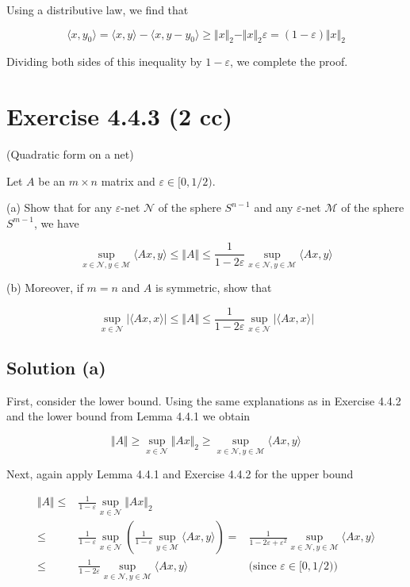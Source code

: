 \documentclass{article}
\begin{document}
Using a distributive law, we find that

$$\langle x, y_0 \rangle = \langle x, y \rangle - \langle x, y - y_0 \rangle \geq \Vert x \Vert_2 - \Vert x \Vert_2 \varepsilon = (1 - \varepsilon) \Vert x \Vert_2$$

Dividing both sides of this inequality by $1 - \varepsilon$, we complete the proof.

\section{Exercise 4.4.3 (2 cc)}
(Quadratic form on a net)

Let $A$ be an $m \times n$ matrix and $\varepsilon \in [0, 1/2)$.

(a) Show that for any $\varepsilon$-net $\mathcal N$ of the sphere $S^{n-1}$ and any $\varepsilon$-net $\mathcal M$ of the sphere $S^{m-1}$, we have

$$\sup_{x \in \mathcal N, y \in \mathcal M} \langle Ax, y \rangle \leq \Vert A \Vert \leq \frac{1}{1 - 2\varepsilon}\sup_{x \in \mathcal N, y \in \mathcal M} \langle Ax, y \rangle$$

(b) Moreover, if $m = n$ and $A$ is symmetric, show that

$$\sup_{x \in \mathcal N} | \langle Ax, x \rangle | \leq \Vert A \Vert \leq \frac{1}{1 - 2\varepsilon}\sup_{x \in \mathcal N} | \langle Ax, x \rangle |$$

\subsection{Solution (a)}

First, consider the lower bound. Using the same explanations as in Exercise 4.4.2 and the lower bound from Lemma 4.4.1 we obtain

$$\Vert A \Vert \geq\sup_{x \in \mathcal N} \Vert Ax \Vert_2 \geq \sup_{x \in \mathcal N, y \in \mathcal M} \langle Ax, y \rangle$$

Next, again apply Lemma 4.4.1 and Exercise 4.4.2 for the upper bound

\begin{equation*}
    \begin{aligned}
        \Vert A \Vert \leq & \frac{1}{1-\varepsilon}\sup_{x \in \mathcal N} \Vert Ax \Vert_2 \\
        \leq & \frac{1}{1-\varepsilon}\sup_{x \in \mathcal N}\left( \frac{1}{1-\varepsilon} \sup_{y \in \mathcal M} \langle Ax, y \rangle \right) = &\frac{1}{1 - 2\varepsilon + \varepsilon^2}\sup_{x \in \mathcal N, y \in \mathcal M}\langle Ax, y \rangle \\
        \leq & \frac{1}{1-2\varepsilon}\sup_{x \in \mathcal N, y \in \mathcal M}\langle Ax, y \rangle &\text{(since $\varepsilon \in [0,1/2)$)}
    \end{aligned}
\end{equation*}
\end{document}

